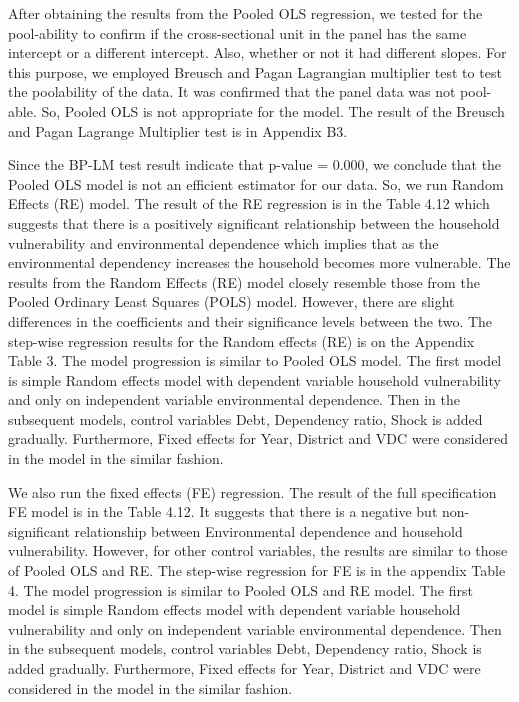 \documentclass[12pt, a4paper]{article}
\begin{document}
After obtaining the results from the Pooled OLS regression, we tested for the pool-ability to confirm if the cross-sectional unit in the panel has the same intercept or a different intercept. Also, whether or not it had different slopes. For this purpose, we employed Breusch and Pagan Lagrangian multiplier test \citep{breusch1980lagrange} to test the poolability of the data. It was confirmed that the panel data was not pool-able. So, Pooled OLS is not appropriate for the model. The result of the Breusch and Pagan Lagrange Multiplier test is in Appendix B3.

Since the BP-LM test result indicate that p-value = 0.000, we conclude that the Pooled OLS model is not an efficient estimator for our data. So, we run Random Effects (RE) model. The result of the RE regression is in the Table 4.12 which suggests that there is a positively significant relationship between the household vulnerability and environmental dependence which implies that as the environmental dependency increases the household becomes more vulnerable. The results from the Random Effects (RE) model closely resemble those from the Pooled Ordinary Least Squares (POLS) model. However, there are slight differences in the coefficients and their significance levels between the two. The step-wise regression results for the Random effects (RE) is on the Appendix Table 3. The model progression is similar to Pooled OLS model. The first model is simple Random effects model with dependent variable household vulnerability and only on independent variable environmental dependence. Then in the subsequent models, control variables Debt, Dependency ratio, Shock is added gradually. Furthermore, Fixed effects for Year, District and VDC were considered in the model in the similar fashion. 

We also run the fixed effects (FE) regression. The result of the full specification FE model is in the Table 4.12. It suggests that there is a  negative but non-significant relationship between Environmental dependence and household vulnerability. However, for other control variables, the results are similar to those of Pooled OLS and RE. The step-wise regression for FE is in the appendix Table 4. The model progression is similar to Pooled OLS and RE model. The first model is simple Random effects model with dependent variable household vulnerability and only on independent variable environmental dependence. Then in the subsequent models, control variables Debt, Dependency ratio, Shock is added gradually. Furthermore, Fixed effects for Year, District and VDC were considered in the model in the similar fashion.      
   
\end{document}
